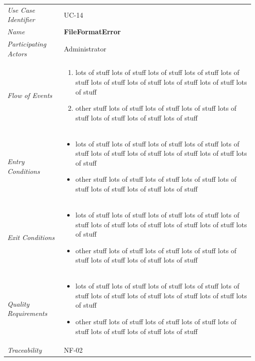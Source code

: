 \documentclass[12pt,letterpaper]{article}
\begin{document}
\begin{center}
	\begin{tabu} to 
		\toprule
		Use Case Identifier & UC-14 \\
		Name & {\bf FileFormatError} \\
		Participating Actors & Administrator \\
		Flow of Events & 
	    \begin{enumerate}[topsep=-1em]
		    \item lots of stuff lots of stuff lots of stuff lots of stuff lots of stuff lots of stuff lots of stuff lots of stuff lots of stuff lots of stuff
		    \item other stuff lots of stuff lots of stuff lots of stuff lots of stuff lots of stuff lots of stuff lots of stuff
		\end{enumerate} \\

		Entry Conditions &
		\begin{itemize}[topsep=-1em]
		    \item lots of stuff lots of stuff lots of stuff lots of stuff lots of stuff lots of stuff lots of stuff lots of stuff lots of stuff lots of stuff
		    \item other stuff lots of stuff lots of stuff lots of stuff lots of stuff lots of stuff lots of stuff lots of stuff
        \end{itemize} \\

		Exit Conditions &
		\begin{itemize}[topsep=-1em]
		    \item lots of stuff lots of stuff lots of stuff lots of stuff lots of stuff lots of stuff lots of stuff lots of stuff lots of stuff lots of stuff
		    \item other stuff lots of stuff lots of stuff lots of stuff lots of stuff lots of stuff lots of stuff lots of stuff
        \end{itemize} \\

		Quality Requirements &
		\begin{itemize}[topsep=-1em]
		    \item lots of stuff lots of stuff lots of stuff lots of stuff lots of stuff lots of stuff lots of stuff lots of stuff lots of stuff lots of stuff
		    \item other stuff lots of stuff lots of stuff lots of stuff lots of stuff lots of stuff lots of stuff lots of stuff
        \end{itemize} \\

		Traceability & NF-02 \\
		\toprule
	\end{tabu}
\end{center}
\end{document}

